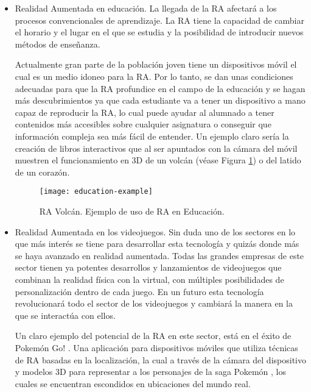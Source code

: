 \begin{itemize}
    \item Realidad Aumentada en educación. La llegada de la RA afectará a los procesos convencionales de aprendizaje. La RA tiene la capacidad de cambiar el horario y el lugar en el que se estudia y la posibilidad de introducir nuevos métodos de enseñanza. 
    
Actualmente gran parte de la población joven tiene un dispositivos móvil el cual es un medio idoneo para la RA. 
Por lo tanto, se dan unas condiciones adecuadas para que la RA profundice en el campo de la educación y se hagan más descubrimientos ya que cada estudiante va a tener un dispositivo a mano capaz de reproducir la RA, 
lo cual puede ayudar al alumnado a tener contenidos más accesibles sobre cualquier asignatura o conseguir que información compleja sea más fácil de entender. Un ejemplo claro sería la creación de libros interactivos que al ser apuntados con la cámara del móvil muestren el funcionamiento en 3D de un volcán (véase Figura \ref{fig:education-example}) o del latido de un corazón.

    \begin{figure}[h]
        \centering
        \texttt{[image: education-example]}
        \caption{RA Volcán. Ejemplo de uso de RA en Educación. }
        \label{fig:education-example}
    \end{figure}
    
    \item Realidad Aumentada en los videojuegos. Sin duda uno de los sectores en lo que más interés se tiene para desarrollar esta tecnología y quizás donde más se haya avanzado en realidad aumentada. Todas las grandes empresas de este sector tienen ya potentes desarrollos y lanzamientos de videojuegos que combinan la realidad física con la virtual, con múltiples posibilidades de personalización dentro de cada juego. En un futuro esta tecnología revolucionará todo el sector de los videojuegos y cambiará la manera en la que se interactúa con ellos.   
    
    Un claro ejemplo del potencial de la RA en este sector, está en el éxito de Pokemón Go! \cite{URL::Pokemon-Go}. Una aplicación para dispositivos móviles que utiliza técnicas de RA basadas en la localización, la cual a través de la cámara del dispositivo y modelos 3D para representar a los personajes de la saga Pokemón \cite{URL::Pokemon}, los cuales se encuentran escondidos en ubicaciones del mundo real.  
    

\end{itemize}
